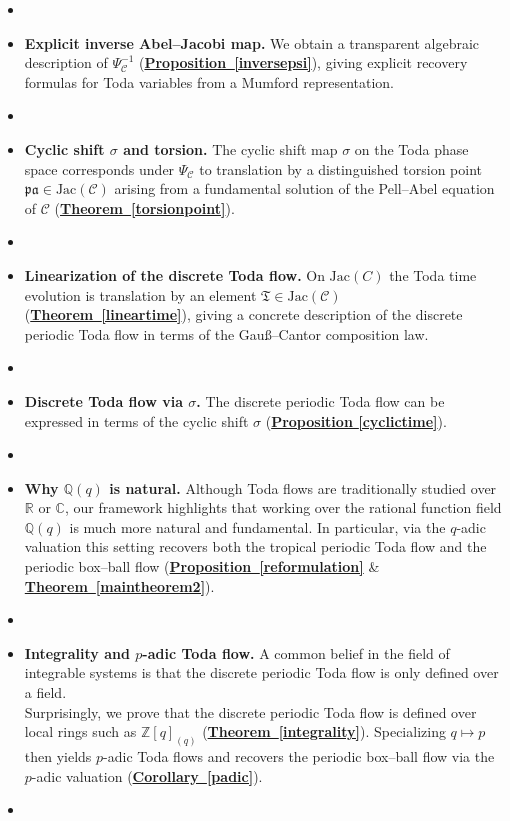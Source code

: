 \documentclass[11pt, a4paper]{amsart}
\theoremstyle{plain}
\numberwithin{equation}{section}
\begin{document}
\begin{itemize}
\item[]
  \item \textbf{Explicit inverse Abel--Jacobi map.}
  We obtain a transparent algebraic description of $\Psi_\mathcal C^{-1}$ (\textbf{\hyperref[inversepsi]{Proposition~\ref*{inversepsi}}}), giving explicit recovery formulas for Toda variables
  from a Mumford representation.
\item[] 
  \item \textbf{Cyclic shift $\sigma$ and torsion.}
  The cyclic shift map $\sigma$ on the Toda phase space corresponds under $\Psi_\mathcal C$ to translation by a distinguished torsion point
  $\mathfrak{pa}\in \mathrm{Jac}(\mathcal C)$ arising from a fundamental solution of the Pell--Abel equation of $\mathcal C$ (\textbf{\hyperref[torsionpoint]{Theorem~\ref*{torsionpoint}}}).
\item []
  \item \textbf{Linearization of the discrete Toda flow.}
  On $\mathrm{Jac}(C)$ the Toda time evolution is translation by an element $\mathfrak T\in \mathrm{Jac}(\mathcal C)$ (\textbf{\hyperref[lineartime]{Theorem~\ref*{lineartime}}}),
  giving a concrete description of the discrete periodic Toda flow in terms of the Gau{\ss}--Cantor composition law.
\item[]
\item \textbf{Discrete Toda flow via $\sigma$.} The discrete periodic Toda flow can be expressed in terms of the cyclic shift $\sigma$ (\textbf{\hyperref[cyclictime]{Proposition \ref*{cyclictime}}}).
\item[]
  \item \textbf{Why $\mathbb{Q}(q)$ is natural.}
  Although Toda flows are traditionally studied over $\mathbb{R}$ or $\mathbb{C}$, our framework highlights that working over the rational
  function field $\mathbb{Q}(q)$ is much more natural and fundamental. In particular, via the $q$-adic valuation this setting recovers both the tropical
  periodic Toda flow and the periodic box--ball flow (\textbf{\hyperref[reformulation]{Proposition~\ref*{reformulation}}} \& \textbf{\hyperref[maintheorem2]{Theorem~\ref*{maintheorem2}}}).
\item[]
  \item \textbf{Integrality and $p$-adic Toda flow.}
  A common belief in the field of integrable systems is that the discrete periodic Toda flow is only defined over a field. \\
  Surprisingly, we prove that the discrete periodic Toda flow is defined over local rings such as $\mathbb{Z}[q]_{(q)}$ (\textbf{\hyperref[integrality]{Theorem~\ref*{integrality}}}).
  Specializing $q\mapsto p$ then yields $p$-adic Toda flows and recovers the periodic box--ball flow via the $p$-adic valuation (\textbf{\hyperref[padic]{Corollary~\ref*{padic}}}).
  \item[]
\end{itemize}
\end{document}
